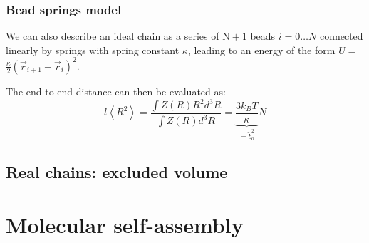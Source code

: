 \documentclass[12pt,a4paper]{article}
\begin{document}
\subsubsection{Bead springs model}
We can also describe an ideal chain as a series of $\mathrm{N}+1$ beads $i=0 \ldots N$ connected linearly by springs with spring constant $\kappa$, leading to an energy of the form $U=$ $\frac{\kappa}{2}\left(\vec{r}_{i+1}-\vec{r}_i\right)^2$. 

The end-to-end distance can then be evaluated as:
$$l\left\langle R^2\right\rangle=\frac{\int Z(R) R^2 d^3 R}{\int Z(R) d^3 R}=\underbrace{\frac{3 k_B T}{\kappa}}_{=\tilde{b}_0^2} N$$

\subsection{Real chains: excluded volume}


\section{Molecular self-assembly}
\end{document}

